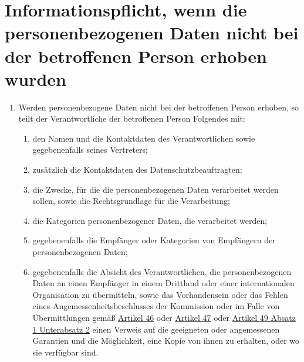 \chapter{Informationspflicht, wenn die personenbezogenen Daten nicht bei der betroffenen Person erhoben wurden}
\label{ch:14}


\begin{enumerate}

  \item Werden personenbezogene Daten nicht bei der betroffenen Person erhoben, so teilt der Verantwortliche der
   betroffenen Person Folgendes mit:
  \label{itm:14-1}

  \begin{enumerate}
  
    \item den Namen und die Kontaktdaten des Verantwortlichen sowie gegebenenfalls seines Vertreters;
    \label{itm:14-1a}

    \item zusätzlich die Kontaktdaten des Datenschutzbeauftragten;
    \label{itm:14-1b}

    \item die Zwecke, für die die personenbezogenen Daten verarbeitet werden sollen, sowie die Rechtsgrundlage für die
     Verarbeitung;
    \label{itm:14-1c}

    \item die Kategorien personenbezogener Daten, die verarbeitet werden;
    \label{itm:14-1d}

    \item gegebenenfalls die Empfänger oder Kategorien von Empfängern der personenbezogenen Daten;
    \label{itm:14-1e}

    \item gegebenenfalls die Absicht des Verantwortlichen, die personenbezogenen Daten an einen Empfänger in einem
     Drittland oder einer internationalen Organisation zu übermitteln, sowie das Vorhandensein oder das Fehlen eines
     Angemessenheitsbeschlusses der Kommission oder im Falle von Übermittlungen gemäß \hyperref[ch:46]{Artikel 46} oder
     \hyperref[ch:47]{Artikel 47} oder \hyperref[itm:49-1-2]{Artikel 49 Absatz 1 Unterabsatz 2} einen Verweis auf die
      geeigneten oder angemessenen Garantien und die Möglichkeit, eine Kopie von ihnen zu erhalten, oder wo sie
      verfügbar sind.
    \label{itm:14-1f}

  \end{enumerate}


\end{enumerate}
